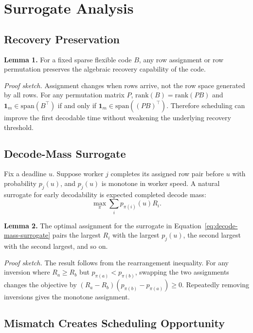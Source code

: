 \section{Surrogate Analysis}

\subsection{Recovery Preservation}

\textbf{Lemma 1.}
For a fixed sparse flexible code $B$, any row assignment or row permutation
preserves the algebraic recovery capability of the code.

\textit{Proof sketch.}
Assignment changes when rows arrive, not the row space generated by all rows.
For any permutation matrix $P$, $\mathrm{rank}(B)=\mathrm{rank}(PB)$ and
$\mathbf{1}_m \in \mathrm{span}(B^\top)$ if and only if
$\mathbf{1}_m \in \mathrm{span}((PB)^\top)$.  Therefore scheduling can improve
the first decodable time without weakening the underlying recovery threshold.

\subsection{Decode-Mass Surrogate}

Fix a deadline $u$.  Suppose worker $j$ completes its assigned row pair before
$u$ with probability $p_j(u)$, and $p_j(u)$ is monotone in worker speed.  A
natural surrogate for early decodability is expected completed decode mass:
\begin{equation}
  \label{eq:decode-mass-surrogate}
  \max_\pi \sum_i p_{\pi(i)}(u) R_i .
\end{equation}

\textbf{Lemma 2.}
The optimal assignment for the surrogate in
Equation~\eqref{eq:decode-mass-surrogate} pairs the largest $R_i$ with the
largest $p_j(u)$, the second largest with the second largest, and so on.

\textit{Proof sketch.}
The result follows from the rearrangement inequality.  For any inversion where
$R_a \ge R_b$ but $p_{\pi(a)} < p_{\pi(b)}$, swapping the two assignments
changes the objective by
$(R_a-R_b)(p_{\pi(b)}-p_{\pi(a)}) \ge 0$.  Repeatedly removing inversions gives
the monotone assignment.

\subsection{Mismatch Creates Scheduling Opportunity}

